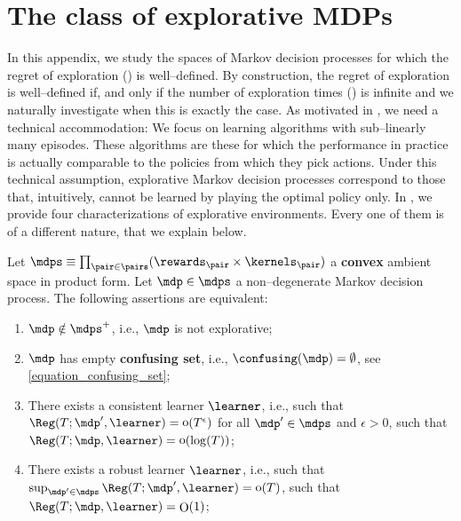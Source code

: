 \documentclass[preprint,cleveref,12pt]{colt2025}
\newenvironment{blackblock}{
    \begin{tcolorbox}[
        enhanced,
        breakable,
        colback=black!10,
        leftrule=1mm,
        toprule=0pt,
        bottomrule=0pt,
        rightrule=0pt,
        arc=0pt,
        before skip=1em plus 2pt,
        after skip=1em plus 2pt,
    ]
}{
    \end{tcolorbox}
}
\def\product{\prod}
\DeclareMathOperator*{\oh}{\mathrm{o}}
\DeclareMathOperator*{\OH}{\mathrm{O}}
\def\model{\mdp}
\def\models{\mdps}
\newcommand{\strong}[1]{\textbf{#1}}
\begin{document}
    \clearpage
    \section{The class of explorative MDPs}
    \label{appendix_exploration}

    In this appendix, we study the spaces of Markov decision processes for which the regret of exploration () is well--defined. 
    By construction, the regret of exploration is well--defined if, and only if the number of exploration times () is infinite and we naturally investigate when this is exactly the case.
    As motivated in , we need a technical accommodation: We focus on learning algorithms with sub--linearly many episodes.
    These algorithms are these for which the performance in practice is actually comparable to the policies from which they pick actions. 
    Under this technical assumption, explorative Markov decision processes correspond to those that, intuitively, cannot be learned by playing the optimal policy only. 
    In , we provide four characterizations of explorative environments. 
    Every one of them is of a different nature, that we explain below.
    
    \begin{blackblock}
        \begin{theorem}
        \label{theorem_characterization_explorative}
            Let $\models \equiv \product_{\pair \in \pairs} (\rewards_\pair \times \kernels_\pair)$ a \strong{convex} ambient space in product form.
            Let $\model \in \models$ a non--degenerate Markov decision process.
            The following assertions are equivalent:
            \begin{enumerate}
                \item $\model \notin \models^+$, i.e., $\model$ is not explorative;
                    \vspace{-.66em}
                \item $\model$ has empty \strong{confusing set}, i.e., $\confusing(\model) = \emptyset$, see \eqref{equation_confusing_set};
                    \vspace{-.66em}
                \item There exists a consistent learner $\learner$, i.e., such that $\Reg(T; \model', \learner) = \oh(T^\epsilon)$ for all $\model' \in \models$ and $\epsilon > 0$, such that $\Reg(T; \model, \learner) = \oh(\log(T))$;
                    \vspace{-.66em}
                \item There exists a robust learner $\learner$, i.e., such that $\sup_{\model' \in \models} \Reg(T; \model', \learner) = \oh(T)$, such that $\Reg(T; \model, \learner) = \OH(1)$;
            \end{enumerate}
        \end{theorem}
    \end{blackblock}
\end{document}
